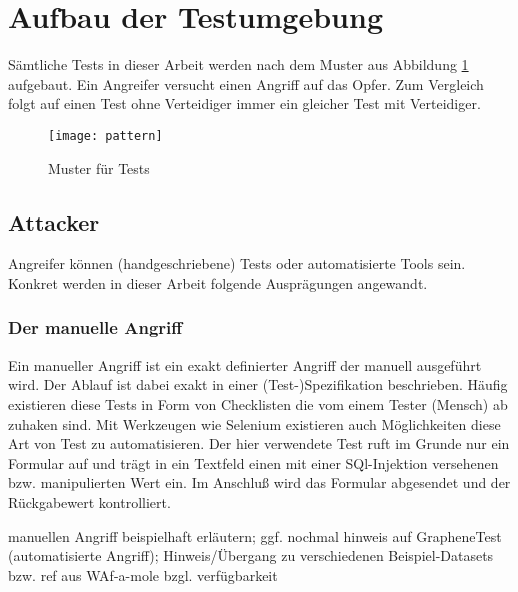 \section{Aufbau der Testumgebung}

Sämtliche Tests in dieser Arbeit werden nach dem Muster aus Abbildung \ref{fig.pattern} aufgebaut. Ein \glqq Angreifer\grqq{} versucht einen Angriff auf das \glqq Opfer\grqq. Zum Vergleich folgt auf einen Test ohne \glqq Verteidiger\grqq{} immer ein gleicher Test mit Verteidiger.

\begin{figure}[bht]
  \begin{center}
    \texttt{[image: pattern]}
    \caption{Muster für Tests}
    \label{fig.pattern}
  \end{center}
\end{figure}

\subsection{Attacker}
Angreifer können (handgeschriebene) Tests oder automatisierte Tools sein. Konkret werden in dieser Arbeit folgende Ausprägungen angewandt.

\subsubsection{Der manuelle Angriff}

Ein manueller Angriff ist ein exakt definierter Angriff der manuell ausgeführt wird. Der Ablauf ist dabei exakt in einer (Test-)Spezifikation beschrieben. Häufig existieren diese Tests in Form von Checklisten die vom einem Tester (Mensch) ab zuhaken sind. Mit Werkzeugen wie Selenium existieren auch Möglichkeiten diese Art von Test zu automatisieren. Der hier verwendete Test ruft im Grunde nur ein Formular auf und trägt in ein Textfeld einen mit einer SQl-Injektion versehenen bzw. manipulierten Wert ein. Im Anschluß wird das Formular abgesendet und der Rückgabewert kontrolliert.

\begin{neu}
manuellen Angriff beispielhaft erläutern; ggf. nochmal hinweis auf GrapheneTest (automatisierte Angriff); Hinweis/Übergang zu verschiedenen Beispiel-Datasets bzw. ref aus WAf-a-mole bzgl. verfügbarkeit
\end{neu}


